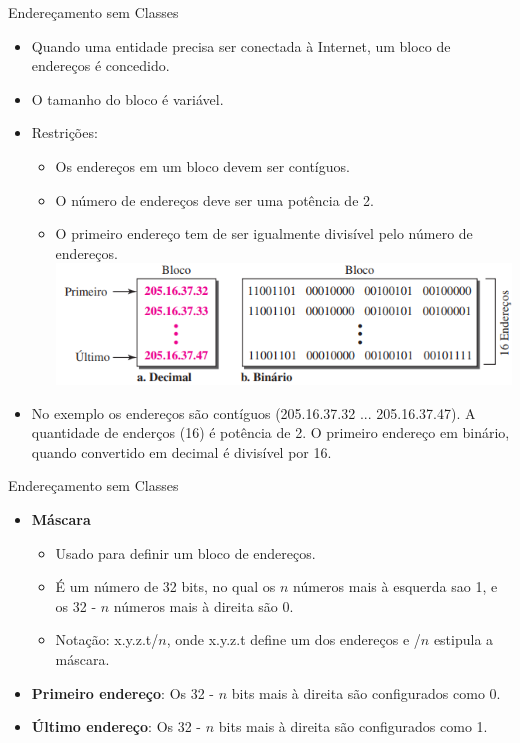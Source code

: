 \documentclass{libs/ufc_format}
\begin{document}
\begin{frame}{Endereçamento sem Classes}
    \begin{itemize}
        \justifying
        \item Quando uma entidade precisa ser conectada à Internet, um bloco de endereços é concedido. 
        \item O tamanho do bloco é variável.
        \item Restrições:
            \begin{itemize}
                \item Os endereços em um bloco devem ser contíguos.
                \item O número de endereços deve ser uma potência de 2.
                \item O primeiro endereço tem de ser igualmente divisível pelo número de endereços.\\
                \includegraphics[scale=0.6]{figuras/figura06_06}
            \end{itemize}
        \item No exemplo os endereços são contíguos (205.16.37.32 ... 205.16.37.47). A quantidade de enderços (16) é potência de 2. O primeiro endereço em binário, quando convertido em decimal é divisível por 16.
    \end{itemize}
\end{frame}

\begin{frame}{Endereçamento sem Classes}
    \begin{itemize}
        \justifying
        \item \textbf{Máscara}
            \begin{itemize}
                \justifying
                \item Usado para definir um bloco de endereços.
                \item É um número de 32 bits, no qual os $n$ números mais à esquerda sao 1, e os 32 - $n$ números mais à direita são 0.
                \item Notação: x.y.z.t/$n$, onde x.y.z.t define um dos endereços e /$n$ estipula a máscara.
            \end{itemize}
        \item \textbf{Primeiro endereço}: Os 32 - $n$ bits mais à direita são configurados como 0.
        \item \textbf{Último endereço}: Os 32 - $n$ bits mais à direita são configurados como 1.
    \end{itemize}
\end{frame}
\end{document}
